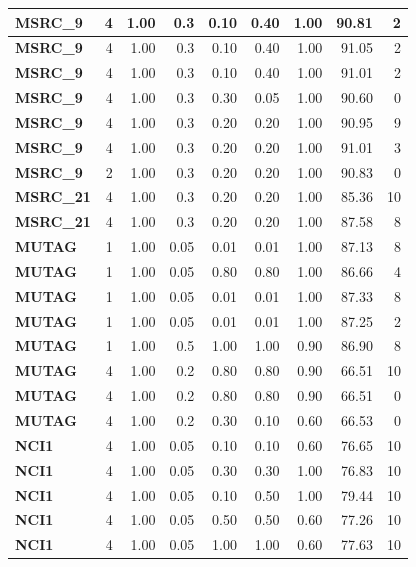 \begin{longtable}{|l||r|r|r|r|r|r||r|r|}
		\textbf{MSRC\_9} & 4 & 1.00 & 0.3 & 0.10 & 0.40 & 1.00 & 90.81 & 2 \\ \hline
		\textbf{MSRC\_9} & 4 & 1.00 & 0.3 & 0.10 & 0.40 & 1.00 & 91.05 & 2 \\ \hline
		\textbf{MSRC\_9} & 4 & 1.00 & 0.3 & 0.10 & 0.40 & 1.00 & 91.01 & 2 \\ \hline
		\textbf{MSRC\_9} & 4 & 1.00 & 0.3 & 0.30 & 0.05 & 1.00 & 90.60 & 0 \\ \hline
		\textbf{MSRC\_9} & 4 & 1.00 & 0.3 & 0.20 & 0.20 & 1.00 & 90.95 & 9 \\ \hline
		\textbf{MSRC\_9} & 4 & 1.00 & 0.3 & 0.20 & 0.20 & 1.00 & 91.01 & 3 \\ \hline
		\textbf{MSRC\_9} & 2 & 1.00 & 0.3 & 0.20 & 0.20 & 1.00 & 90.83 & 0 \\ \hline
		\textbf{MSRC\_21} & 4 & 1.00 & 0.3 & 0.20 & 0.20 & 1.00 & 85.36 & 10 \\ \hline
		\textbf{MSRC\_21} & 4 & 1.00 & 0.3 & 0.20 & 0.20 & 1.00 & 87.58 & 8 \\ \hline
		\textbf{MUTAG} & 1 & 1.00 & 0.05 & 0.01 & 0.01 & 1.00 & 87.13 & 8 \\ \hline
		\textbf{MUTAG} & 1 & 1.00 & 0.05 & 0.80 & 0.80 & 1.00 & 86.66 & 4 \\ \hline
		\textbf{MUTAG} & 1 & 1.00 & 0.05 & 0.01 & 0.01 & 1.00 & 87.33 & 8 \\ \hline
		\textbf{MUTAG} & 1 & 1.00 & 0.05 & 0.01 & 0.01 & 1.00 & 87.25 & 2 \\ \hline
		\textbf{MUTAG} & 1 & 1.00 & 0.5 & 1.00 & 1.00 & 0.90 & 86.90 & 8 \\ \hline
		\textbf{MUTAG} & 4 & 1.00 & 0.2 & 0.80 & 0.80 & 0.90 & 66.51 & 10 \\ \hline
		\textbf{MUTAG} & 4 & 1.00 & 0.2 & 0.80 & 0.80 & 0.90 & 66.51 & 0 \\ \hline
		\textbf{MUTAG} & 4 & 1.00 & 0.2 & 0.30 & 0.10 & 0.60 & 66.53 & 0 \\ \hline
		\textbf{NCI1} & 4 & 1.00 & 0.05 & 0.10 & 0.10 & 0.60 & 76.65 & 10 \\ \hline
		\textbf{NCI1} & 4 & 1.00 & 0.05 & 0.30 & 0.30 & 1.00 & 76.83 & 10 \\ \hline
		\textbf{NCI1} & 4 & 1.00 & 0.05 & 0.10 & 0.50 & 1.00 & 79.44 & 10 \\ \hline
		\textbf{NCI1} & 4 & 1.00 & 0.05 & 0.50 & 0.50 & 0.60 & 77.26 & 10 \\ \hline
		\textbf{NCI1} & 4 & 1.00 & 0.05 & 1.00 & 1.00 & 0.60 & 77.63 & 10 \\ \hline

\end{longtable}
